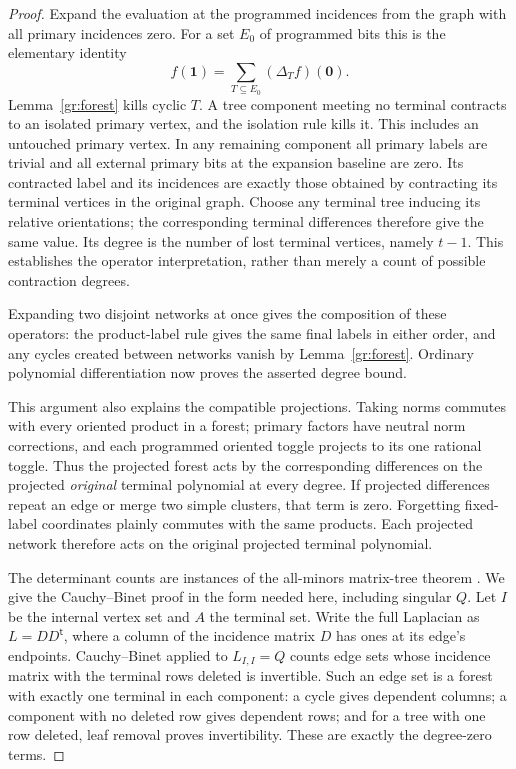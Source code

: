 \begin{proof}
Expand the evaluation at the programmed incidences from the graph with
all primary incidences zero.  For a set $E_0$ of programmed bits this is
the elementary identity
\[
 f(\mathbf1)=\sum_{T\subseteq E_0}(\Delta_T f)(\mathbf0).
\]
Lemma~\ref{gr:forest} kills cyclic $T$.  A tree component meeting no
terminal contracts to an isolated primary vertex, and the isolation rule
kills it.  This includes an untouched primary vertex.  In any remaining
component all primary labels are trivial and all external primary bits
at the expansion baseline are zero.  Its contracted label and its
incidences are exactly those obtained by contracting its terminal
vertices in the original graph.  Choose any terminal tree inducing its
relative orientations; the corresponding terminal differences therefore
give the same value.  Its degree is the number of lost terminal vertices,
namely $t-1$.  This establishes the operator interpretation, rather than
merely a count of possible contraction degrees.

Expanding two disjoint networks at once gives the composition of these
operators: the product-label rule gives the same final labels in either
order, and any cycles created between networks vanish by
Lemma~\ref{gr:forest}.  Ordinary polynomial differentiation now proves
the asserted degree bound.

This argument also explains the compatible projections.  Taking norms
commutes with every oriented product in a forest; primary factors have
neutral norm corrections, and each programmed oriented toggle projects
to its one rational toggle.  Thus the projected forest acts by the
corresponding differences on the projected \emph{original} terminal
polynomial at every degree.  If projected differences repeat an edge
or merge two simple clusters, that term is zero.  Forgetting fixed-label
coordinates plainly commutes with the same products.  Each projected
network therefore acts on the original projected terminal polynomial.

The determinant counts are instances of the all-minors matrix-tree
theorem \cite[\S1]{Chaiken1982}.  We give the Cauchy--Binet proof
in the form needed here, including singular $Q$.  Let $I$
be the internal vertex set and $A$ the terminal set.  Write the full
Laplacian as $L=DD^{\mathsf t}$, where a column of the incidence matrix
$D$ has ones at its edge's endpoints.  Cauchy--Binet applied to
$L_{I,I}=Q$ counts edge sets whose incidence matrix with the terminal
rows deleted is invertible.  Such an edge set is a forest with exactly
one terminal in each component: a cycle gives dependent columns; a
component with no deleted row gives dependent rows; and for a tree with
one row deleted, leaf removal proves invertibility.  These are exactly
the degree-zero terms.


\end{proof}
